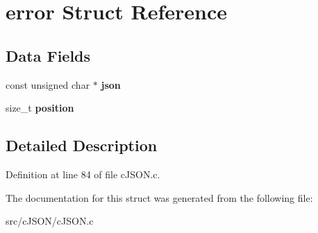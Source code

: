 \hypertarget{structerror}{}\section{error Struct Reference}
\label{structerror}
\subsection*{Data Fields}
\begin{DoxyCompactItemize}
\item 
\mbox{\label{structerror_a9b123855d5dd48e86de846588462b39f}} 
const unsigned char $\ast$ {\bfseries json}
\item 
\mbox{\label{structerror_a24de70a4d517ab351d80c18582cadb66}} 
size\+\_\+t {\bfseries position}
\end{DoxyCompactItemize}


\subsection{Detailed Description}


Definition at line 84 of file c\+J\+S\+O\+N.\+c.



The documentation for this struct was generated from the following file\+:\begin{DoxyCompactItemize}
\item 
src/c\+J\+S\+O\+N/c\+J\+S\+O\+N.\+c\end{DoxyCompactItemize}
